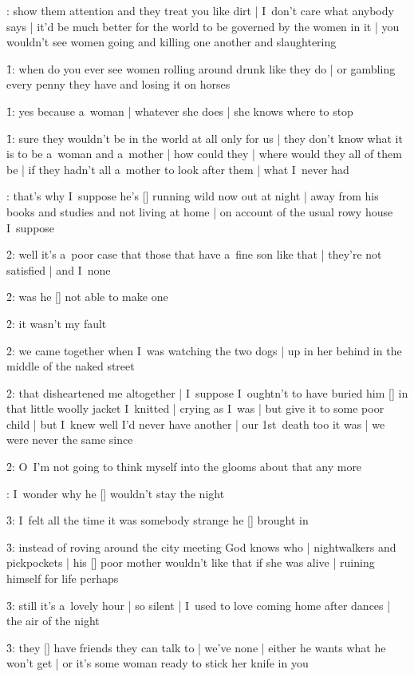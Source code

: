:
show them attention and they treat you like dirt |
I~don't care what anybody says |
it'd be much better for the world to be governed by the women in it |
you wouldn't see women going and killing one another and slaughtering

\f1:
when do you ever see women rolling around drunk like they do |
or gambling every penny they have and losing it on horses

\f1:
yes because a~woman |
whatever she does |
she knows where to stop

\f1:
sure they wouldn't be in the world at all
only for us |
they don't know what it is to be a~woman and a~mother |
how could they |
where would they all of them be |
if they hadn't all a~mother to look after them |
what I~never had

:
that's why I~suppose he's [\stephen] running wild now out at night |
away from his books and studies and not living at home |
on account of the usual rowy house I~suppose

\f2:
well it's a~poor case that those that have a~fine son like that |
they're not satisfied |
and I~none

\f2:
was he [\bloom] not able to make one

\f2:
it wasn't my fault

\f2:
we came together when I~was watching the two dogs |
up in her behind in the middle of the naked street

\f2:
that disheartened me altogether |
I~suppose I~oughtn't to have buried him [\rudy]
in that little woolly jacket I~knitted |
crying as I~was |
but give it to some poor child |
but I~knew well I'd never have another |
our 1st~death too it was |
we were never the same since

\f2:
O~I'm not going to think myself into the glooms about that any more

:
I~wonder why he [\stephen] wouldn't stay the night

\f3:
I~felt all the time it was somebody strange he [\bloom] brought in

\f3:
instead of roving around the city meeting God knows who |
nightwalkers and pickpockets |
his [\stephen] poor mother wouldn't like that if she was alive |
ruining himself for life perhaps

\f3:
still it's a~lovely hour |
so silent |
I~used to love coming home after dances |
the air of the night

\f3:
they [\men] have friends they can talk to |
we've none |
either he wants what he won't get |
or it's some woman ready to stick her knife in you

